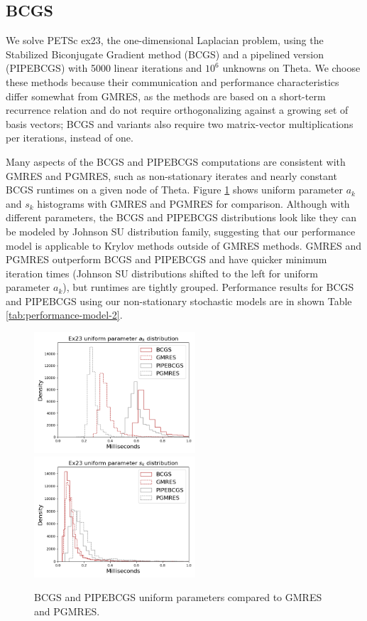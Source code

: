 \documentclass[sigconf]{acmart}
\begin{document}
\subsection{BCGS}\label{sec:bcgs}

We solve PETSc ex23, the one-dimensional Laplacian problem, using the Stabilized Biconjugate Gradient method (BCGS) and a pipelined version (PIPEBCGS) with 5000 linear iterations and $10^6$ unknowns on Theta.  
We choose these methods because their communication and performance characteristics differ somewhat from GMRES, as the methods are based on a short-term recurrence relation and do not require orthogonalizing against a growing set of basis vectors; BCGS and variants also require two matrix-vector multiplications per iterations, instead of one.

Many aspects of the BCGS and PIPEBCGS computations are consistent with GMRES and PGMRES, such as non-stationary iterates and nearly constant BCGS runtimes on a given node of Theta. 
Figure \ref{fig:bcgs} shows uniform parameter $a_k$ and $s_k$ histograms with GMRES and PGMRES for comparison. 
Although with different parameters, the BCGS and PIPEBCGS distributions look like they can be modeled by Johnson SU distribution family, 
suggesting that our performance model is applicable to Krylov methods outside of GMRES methods.
GMRES and PGMRES outperform BCGS and PIPEBCGS and have quicker minimum iteration times (Johnson SU distributions shifted to the left for uniform parameter $a_k$), but runtimes are  tightly grouped.
Performance results for BCGS and PIPEBCGS using our non-stationary stochastic models are in shown Table \ref{tab:performance-model-2}.


\begin{figure}[t]
\centering
\includegraphics[width=6cm]{../plots/BCGS_GMRES_PIPEBCGS_PGMRES_ex23_8192_1000000_uniform_a_k.png} 
\includegraphics[width=6cm]{../plots/BCGS_GMRES_PIPEBCGS_PGMRES_ex23_8192_1000000_uniform_s_k.png}
\caption{BCGS and PIPEBCGS uniform parameters compared to GMRES and PGMRES.} \label{fig:bcgs}
\end{figure}
\end{document}
